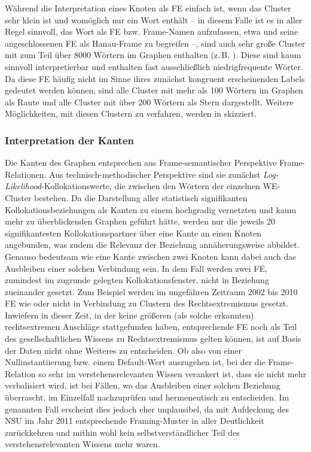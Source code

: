 Während die Interpretation eines Knoten als FE einfach ist, wenn das Cluster sehr klein ist und womöglich nur ein Wort enthält -- in diesem Falle ist es in aller Regel sinnvoll, das Wort als FE bzw. Frame-Namen aufzufassen, etwa  und seine angeschlossenen FE als Hanau-Frame zu begreifen --, sind auch sehr große Cluster mit zum Teil über 8000 Wörtern im Graphen enthalten (z.\,B. ). Diese sind kaum sinnvoll interpretierbar und enthalten fast ausschließlich niedrigfrequente Wörter. Da diese FE häufig nicht im Sinne ihres zunächst kongruent erscheinenden Labels gedeutet werden können, sind alle Cluster mit mehr als 100 Wörtern im Graphen als Raute und alle Cluster mit über 200 Wörtern als Stern dargestellt. Weitere Möglichkeiten, mit diesen Clustern zu verfahren, werden in  skizziert.

\subsubsection{Interpretation der Kanten}\label{interpretation-der-kanten}

Die Kanten des Graphen entsprechen aus Frame-semantischer Perspektive Frame-Relationen. Aus technisch-methodischer Perspektive sind sie zunächst \emph{Log-Likelihood}-Kollokationswerte, die zwischen den Wörtern der einzelnen WE-Cluster bestehen. Da die Darstellung aller statistisch signifikanten Kollokationsbeziehungen als Kanten zu einem hochgradig vernetzten und kaum mehr zu überblickenden Graphen geführt hätte, werden nur die jeweils 20 signifikantesten Kollokationspartner über eine Kante an einen Knoten angebunden, was zudem die Relevanz der Beziehung annäherungsweise abbildet. Genauso bedeutsam wie eine Kante zwischen zwei Knoten kann dabei auch das Ausbleiben einer solchen Verbindung sein. In dem Fall werden zwei FE, zumindest im zugrunde gelegten Kollokationsfenster, nicht in Beziehung zueinander gesetzt. Zum Beispiel werden im ungefähren Zeitraum 2002 bis 2010 FE wie  oder  nicht in Verbindung zu Clustern des Rechtsextremismus gesetzt. Inwiefern in dieser Zeit, in der keine größeren (als solche erkannten) rechtsextremen Anschläge stattgefunden haben, entsprechende FE noch als Teil des gesellschaftlichen Wissens zu Rechtsextremismus gelten können, ist auf Basis der Daten nicht ohne Weiteres zu entscheiden. Ob also von einer Nullinstantiierung bzw. einem Default-Wert auszugehen ist, bei der die Frame-Relation so sehr im verstehensrelevanten Wissen verankert ist, dass sie nicht mehr verbalisiert wird, ist bei Fällen, wo das Ausbleiben einer solchen Beziehung überrascht, im Einzelfall nachzuprüfen und hermeneutisch zu entscheiden. Im genannten Fall erscheint dies jedoch eher unplausibel, da mit Aufdeckung des NSU im Jahr 2011 entsprechende Framing-Muster in aller Deutlichkeit zurückkehren und mithin wohl kein selbstverständlicher Teil des verstehensrelevanten Wissens mehr waren.

